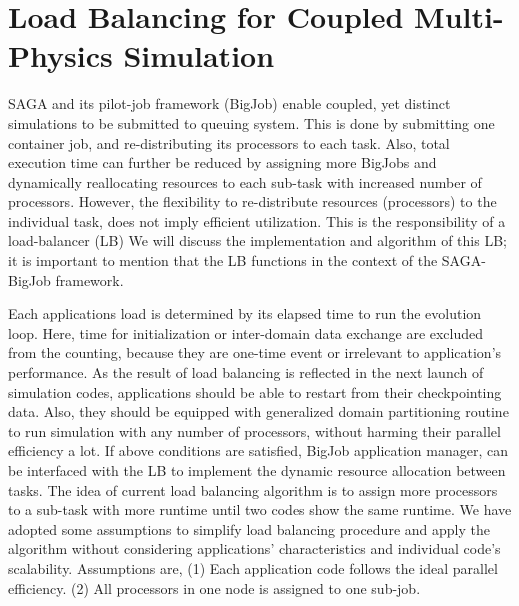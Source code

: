 \documentclass[conference,final]{IEEEtran}
\begin{document}
\section{Load Balancing for Coupled Multi-Physics Simulation}


SAGA and its pilot-job framework (BigJob) enable coupled, yet distinct simulations to be
submitted to queuing system.  This is done by submitting one container job, and re-distributing its processors to each task.  Also, total execution time can further be reduced by assigning more BigJobs and dynamically reallocating resources to each sub-task with increased number of processors.
However, the flexibility to re-distribute resources (processors) to the individual task, does
not imply efficient utilization. This is the responsibility of a load-balancer (LB)
We will discuss the implementation and algorithm of this LB; it is important
to mention that the LB functions in the context of the SAGA-BigJob framework.


Each applications load is determined by its elapsed time to run the evolution loop. Here, time for initialization or inter-domain data exchange are excluded from the counting, because they are one-time event or irrelevant to application's performance. As the result of load balancing is reflected in the next launch of simulation codes, applications should be able to restart from their checkpointing data. Also, they should be equipped with generalized domain partitioning routine to run simulation with any number of processors, without harming their parallel efficiency a lot.  If above conditions are satisfied, BigJob application manager,
can be interfaced with the LB to implement the dynamic resource allocation between tasks.
The idea of current load balancing algorithm is to assign more processors to a sub-task with more runtime until two codes show the same runtime. We have adopted some assumptions to simplify load balancing procedure and apply the algorithm without considering applications' characteristics and individual code's scalability. Assumptions are, (1) Each application code follows the ideal parallel efficiency.
(2) All processors in one node is assigned to one sub-job.
\end{document}
